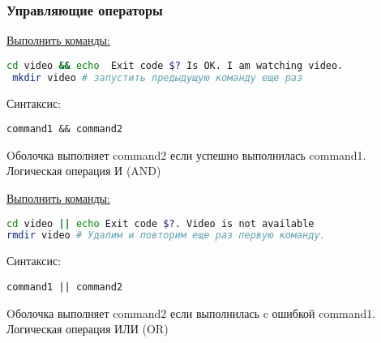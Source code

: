 \begin{frame}[fragile]
\frametitle{Управляющие операторы}

\underline{Выполнить команды:}
\begin{lstlisting}[language=bash]
 cd video && echo  Exit code $? Is OK. I am watching video.
 mkdir video # запустить предыдущую команду еще раз
\end{lstlisting}

\pause

Синтаксис:
\begin{verbatim}
command1 && command2
\end{verbatim}
Oболочка выполняет command2 если \alert{успешно} выполнилась command1. Логическая операция И (AND)
\pause

\underline{Выполнить команды:}
\pause
\begin{lstlisting}[language=bash]
cd video || echo Exit code $?. Video is not available 
rmdir video # Удалим и повторим еще раз первую команду.
\end{lstlisting}

\pause

Синтаксис:
\begin{verbatim}
command1 || command2
\end{verbatim}
Oболочка выполняет command2 если выполнилась c \alert{ошибкой} command1. Логическая операция ИЛИ (OR)
\end{frame}


